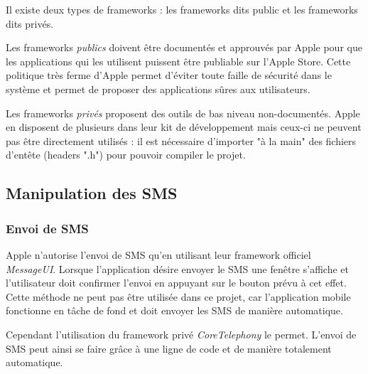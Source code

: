 Il existe deux types de frameworks : les frameworks dits public et les frameworks dits privés.

Les frameworks \textit{publics} doivent être documentés et approuvés par Apple pour que les applications qui les utilisent puissent être publiable sur l'Apple Store.
Cette politique très ferme d'Apple permet d'éviter toute faille de sécurité dans le système et permet de proposer des applications sûres aux utilisateurs.

Les frameworks \textit{privés} proposent des outils de bas niveau non-documentés.
Apple en disposent de plusieurs dans leur kit de développement mais ceux-ci ne peuvent pas être directement utilisés : il est nécessaire d'importer "à la main" des fichiers d'entête (headers ".h") pour pouvoir compiler le projet.




\subsection{Manipulation des SMS}


\subsubsection{Envoi de SMS}

Apple n'autorise l'envoi de SMS qu'en utilisant leur framework officiel \textit{MessageUI}.
Lorsque l'application désire envoyer le SMS une fenêtre s'affiche et l'utilisateur doit confirmer l'envoi en appuyant sur le bouton prévu à cet effet.
Cette méthode ne peut pas être utilisée dans ce projet, car l'application mobile fonctionne en tâche de fond et doit envoyer les SMS de manière automatique.

Cependant l'utilisation du framework privé \textit{CoreTelephony} le permet.
L'envoi de SMS peut ainsi se faire grâce à une ligne de code et de manière totalement automatique.


